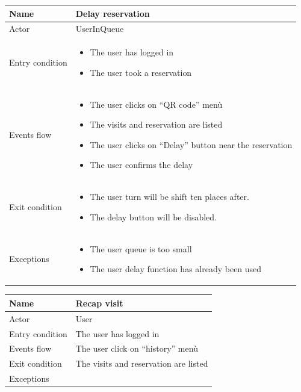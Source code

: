 \begin{tabular}{|p{5cm} | p{7cm} | }
	\hline
	Name & Delay reservation \\
	\hline
	Actor & UserInQueue \\
	\hline
	Entry condition &
	\begin{itemize}
		\item The user has logged in
		\item The user took a reservation
	\end{itemize} \\
	\hline
	Events flow & 
	\begin{itemize}
		\item The user clicks on “QR code” menù
		\item The visits and reservation are listed
		\item The user clicks on “Delay” button near the reservation
		\item The user confirms the delay
	\end{itemize} \\
	\hline
	Exit condition &
	\begin{itemize}
		\item The user turn will be shift ten places after.
		\item The delay button will be disabled.
	\end{itemize} \\
	\hline 
	Exceptions & 
	\begin{itemize}
		\item The user queue is too small
		\item The user delay function has already been used
	\end{itemize} \\
	\hline
\end{tabular}

\par \medskip

\begin{tabular}{|p{5cm} | p{7cm} | }
	\hline
	Name & Recap visit \\
	\hline
	Actor & User \\
	\hline
	Entry condition &
	The user has logged in \\
	\hline
	Events flow & 
	The user click on “history” menù \\
	\hline
	Exit condition &
	The visits and reservation are listed \\
	\hline 
	Exceptions & \\
	\hline
\end{tabular}

